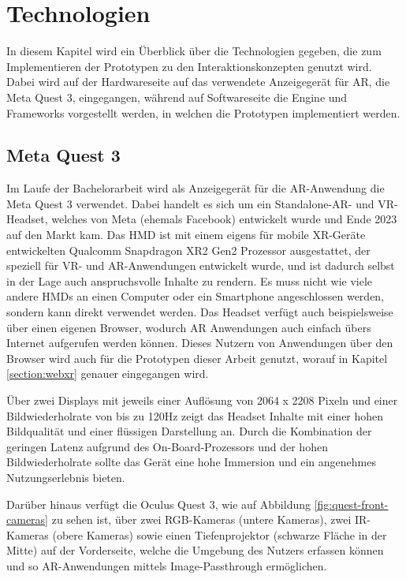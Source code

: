 \chapter{Technologien}

In diesem Kapitel wird ein Überblick über die Technologien gegeben, die zum Implementieren der Prototypen zu den Interaktionskonzepten genutzt wird.
Dabei wird auf der Hardwareseite auf das verwendete Anzeigegerät für AR, die Meta Quest 3, eingegangen, während auf Softwareseite die Engine und Frameworks vorgestellt werden, in welchen die Prototypen implementiert werden.

\section{Meta Quest 3}

Im Laufe der Bachelorarbeit wird als Anzeigegerät für die AR-Anwendung die Meta Quest 3 verwendet.
Dabei handelt es sich um ein Standalone-AR- und VR-Headset, welches von Meta (ehemals Facebook) entwickelt wurde und Ende 2023 auf den Markt kam.
Das HMD ist mit einem eigens für mobile XR-Geräte entwickelten Qualcomm Snapdragon XR2 Gen2 Prozessor ausgestattet, der speziell für VR- und AR-Anwendungen entwickelt wurde, und ist dadurch selbst in der Lage auch anspruchsvolle Inhalte zu rendern.
Es muss nicht wie viele andere HMDs an einen Computer oder ein Smartphone angeschlossen werden, sondern kann direkt verwendet werden.
Das Headset verfügt auch beispielsweise über einen eigenen Browser, wodurch AR Anwendungen auch einfach übers Internet aufgerufen werden können.
Dieses Nutzern von Anwendungen über den Browser wird auch für die Prototypen dieser Arbeit genutzt, worauf in Kapitel \ref{section:webxr} genauer eingegangen wird.

Über zwei Displays mit jeweils einer Auflösung von 2064 x 2208 Pixeln und einer Bildwiederholrate von bis zu 120Hz zeigt das Headset Inhalte mit einer hohen Bildqualität und einer flüssigen Darstellung an.
Durch die Kombination der geringen Latenz aufgrund des On-Board-Prozessors und der hohen Bildwiederholrate sollte das Gerät eine hohe Immersion und ein angenehmes Nutzungserlebnis bieten.

\newpage

Darüber hinaus verfügt die Oculus Quest 3, wie auf Abbildung \ref{fig:quest-front-cameras} zu sehen ist, über zwei RGB-Kameras (untere Kameras), zwei IR-Kameras (obere Kameras) sowie einen Tiefenprojektor (schwarze Fläche in der Mitte) auf der Vorderseite, welche die Umgebung des Nutzers erfassen können und so AR-Anwendungen mittels Image-Passthrough ermöglichen.


